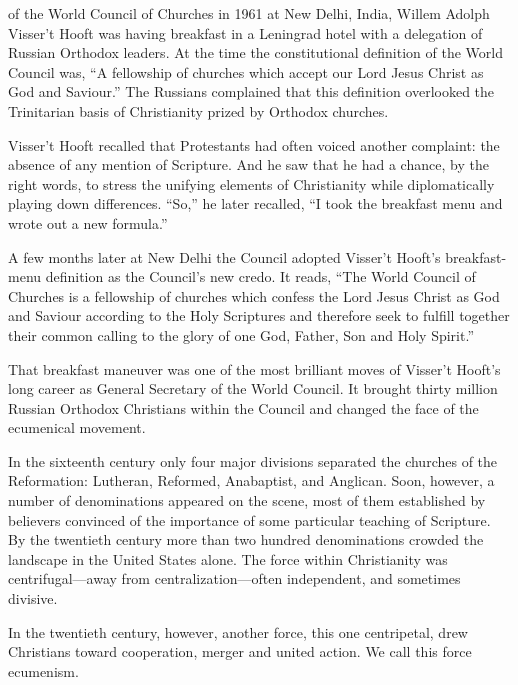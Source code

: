
 of the World Council of Churches in 1961 at New Delhi,
India, Willem Adolph Visser’t Hooft was having breakfast in a Leningrad hotel with a delegation of
Russian Orthodox leaders. At the time the constitutional definition of the World Council was, “A
fellowship of churches which accept our Lord Jesus Christ as God and Saviour.” The Russians
complained that this definition overlooked the Trinitarian basis of Christianity prized by Orthodox
churches.

Visser’t Hooft recalled that Protestants had often voiced another complaint: the absence of any
mention of Scripture. And he saw that he had a chance, by the right words, to stress the unifying
elements of Christianity while diplomatically playing down differences. “So,” he later recalled, “I
took the breakfast menu and wrote out a new formula.”

A few months later at New Delhi the Council adopted Visser’t Hooft’s breakfast-menu definition as
the Council’s new credo. It reads, “The World Council of Churches is a fellowship of churches which
confess the Lord Jesus Christ as God and Saviour according to the Holy Scriptures and therefore seek
to fulfill together their common calling to the glory of one God, Father, Son and Holy Spirit.”

That breakfast maneuver was one of the most brilliant moves of Visser’t Hooft’s long career as
General Secretary of the World Council. It brought thirty million Russian Orthodox Christians within
the Council and changed the face of the ecumenical movement.

In the sixteenth century only four major divisions separated the churches of the Reformation:
Lutheran, Reformed, Anabaptist, and Anglican. Soon, however, a number of denominations appeared on
the scene, most of them established by believers convinced of the importance of some particular
teaching of Scripture. By the twentieth century more than two hundred denominations crowded the
landscape in the United States alone. The force within Christianity was centrifugal—away from
centralization—often independent, and sometimes divisive.

In the twentieth century, however, another force, this one centripetal, drew Christians toward
cooperation, merger and united action. We call this force ecumenism.

